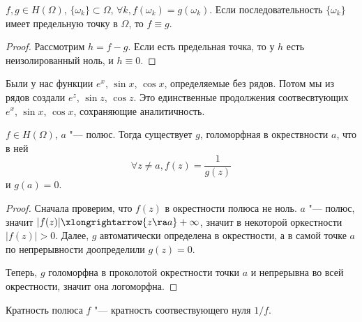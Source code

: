 \begin{theorem}[о единственности]
	$f, g \in H(\Omega)$, $\{\omega_k\} \subset \Omega$, $\forall k, f(\omega_k) = g(\omega_k)$.
	Если последовательность $\{\omega_k\}$ имеет предельную точку в $\Omega$, то $f \equiv g$.
\end{theorem}
\begin{proof}
	Рассмотрим $h = f - g$.
	Если есть предельная точка, то у $h$ есть неизолированный ноль, и $h \equiv 0$.
\end{proof}

\begin{Rem}
	Были у нас функции $e^x$, $\sin x$, $\cos x$, определяемые без рядов.
	Потом мы из рядов создали $e^z$, $\sin z$, $\cos z$.
	Это единственные продолжения соотвесвтующих $e^x$, $\sin x$, $\cos x$, сохраняющие аналитичность.
\end{Rem}

\begin{theorem}
	$f \in H(\Omega)$, $a$ "--- полюс.
	Тогда существует $g$, голоморфная в окрествности $a$, что в ней
	\[ \forall z \ne a, f(z) = \frac1{g(z)} \]
	и $g(a) = 0$.
\end{theorem}
\begin{proof}
	Сначала проверим, что $f(z)$ в окрестности полюса не ноль.
	$a$ "--- полюс, значит $|f(z)| \xlongrightarrow{z \ra a} +\infty$, значит в некоторой оркестности $|f(z)| > 0$.
	Далее, $g$ автоматически определена в окрестности, а в самой точке $a$ по непрерывности доопределили $g(z) = 0$.

	Теперь, $g$ голоморфна в проколотой окрестности точки $a$ и непрерывна во всей окрестности, значит она логоморфна.
\end{proof}

\begin{Def}
	Кратность полюса $f$ "--- кратность соотвествующего нуля $1/f$.
\end{Def}

